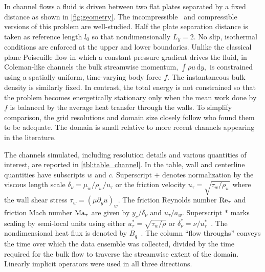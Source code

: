 In channel flows a fluid is driven between two flat plates separated by a fixed
distance as shown in \autoref{fig:geometry}.  The
incompressible~\citep{Kim1987Turbulence, Hoyas2006Scaling, DelAlamo2003Spectra,
DelAlamo2004Scaling, Simens2009Highresolution, Hoyas2008Reynolds} and
compressible~\citep{Coleman1995Numerical, Huang1995Compressible, Li2001DNS,
Morinishi2005Study, Friedrich2007Compressible, Friedrich2004Turbulence,
Lechner2001Turbulent, Schwartz1987Perturbation} versions of this problem are
well-studied.  Half the plate separation distance is taken as reference length
$l_0$ so that nondimensionally $L_y=2$.  No slip, isothermal conditions are
enforced at the upper and lower boundaries.  Unlike the classical plane
Poiseuille flow in which a constant pressure gradient drives the fluid, in
Coleman-like channels the bulk streamwise momentum, $\int\rho{}u\,\mathrm{d}\!y,$
is constrained using a spatially uniform, time-varying body force $f$.  The
instantaneous bulk density is similarly fixed.  In contrast, the total energy is
not constrained so that the problem becomes energetically stationary only when
the mean work done by $f$ is balanced by the average heat transfer through the
walls.  To simplify comparison, the grid resolutions and domain size closely
follow \citet{Coleman1995Numerical} who found them to be adequate.  The domain
is small relative to more recent channels appearing in the
literature.


%
The channels simulated, including resolution details and various quantities of
interest, are reported in \autoref{tbl:table_channel}.  In the table, wall and
centerline quantities have subscripts $w$ and $c$.  Superscript ${+}$ denotes
normalization by the viscous length scale $\delta_\nu = \mu_w / \rho_w / u_\tau$ or the friction
velocity $u_\tau = \sqrt{\tau_w / \rho_w}$ where the wall shear stress
$\tau_w = \left(\mu \partial_y u\right)_w$.  The friction Reynolds number
$\Reynolds[\tau]{}$ and friction Mach number $\Mach[\tau]{}$ are given by
$y_c/\delta_\nu$ and $u_\tau/a_w$.  Superscript $\ast$ marks
scaling by semi-local units
%
using either $u^\ast_\tau = \sqrt{\tau_w / \rho}$ or $\delta^\ast_\nu = \nu / u^\ast_\tau$~\citep{Huang1995Compressible,Morinishi2005Study}.
The nondimensional heat flux is denoted by
$B_q$~\citep{Bradshaw1977Compressible}.  The column ``flow throughs'' conveys
the time over which the data ensemble was collected, divided by the time required
for the bulk flow to traverse the streamwise extent of the domain.
Linearly implicit operators were used in all three directions.


